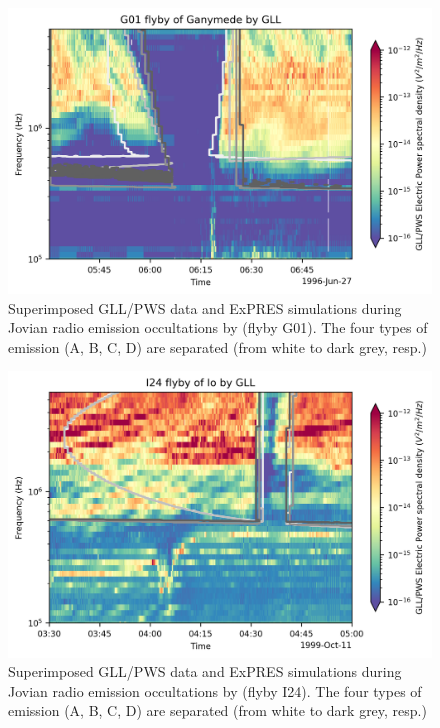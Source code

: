 \documentclass[referee]{aa}
\begin{document}
\begin{figure}
    \centering
    \includegraphics[width=0.99\linewidth]{Moon_flyby_galileo_occultation_data_simu_G01.png}
    \caption{Superimposed GLL/PWS data and ExPRES simulations during Jovian radio emission occultations by  (flyby G01). The four types of emission (A, B, C, D) are separated (from white to dark grey, resp.)}
    \label{fig:flyby_occultation_G01}
\end{figure}




\begin{figure}
    \centering
    \includegraphics[width=0.99\linewidth]{Moon_flyby_galileo_occultation_data_simu_I24.png}
    \caption{Superimposed GLL/PWS data and ExPRES simulations during Jovian radio emission occultations by  (flyby I24). The four types of emission (A, B, C, D) are separated (from white to dark grey, resp.)}
    \label{fig:flyby_occultation_I24}
\end{figure}
\end{document}
